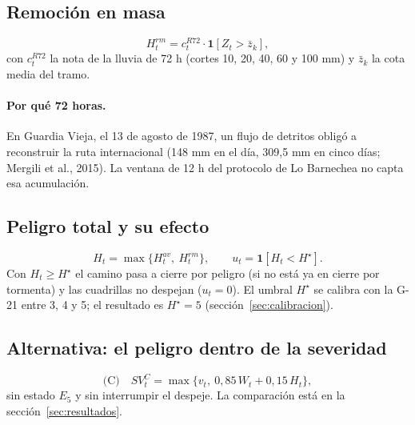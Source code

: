 \subsection{Remoción en masa}
\begin{equation}
H^{rm}_t = c^{R72}_t \cdot \mathbf{1}\!\left[Z_t > \bar z_k\right],
\end{equation}
con $c^{R72}_t$ la nota de la lluvia de 72 h (cortes 10, 20, 40, 60 y 100 mm) y $\bar z_k$ la cota media del tramo.

\paragraph{Por qué 72 horas.} En Guardia Vieja, el 13 de agosto de 1987, un flujo de detritos obligó a reconstruir la ruta internacional (148 mm en el día, 309,5 mm en cinco días; Mergili et al., 2015). La ventana de 12 h del protocolo de Lo Barnechea no capta esa acumulación.

\subsection{Peligro total y su efecto}
\begin{equation}
H_t = \max\{H^{av}_t,\ H^{rm}_t\}, \qquad u_t = \mathbf{1}\!\left[H_t < H^{\star}\right].
\end{equation}
Con $H_t \ge H^\star$ el camino pasa a cierre por peligro (si no está ya en cierre por tormenta) y las cuadrillas no despejan ($u_t = 0$). El umbral $H^\star$ se calibra con la G-21 entre 3, 4 y 5; el resultado es $H^\star = 5$ (sección~\ref{sec:calibracion}).

\subsection{Alternativa: el peligro dentro de la severidad}\label{sec:peligro_dentro}
\begin{equation}
\text{(C)}\quad SV^{C}_t = \max\big\{v_t,\ 0{,}85\, W_t + 0{,}15\, H_t\big\},
\end{equation}
sin estado $E_5$ y sin interrumpir el despeje. La comparación está en la sección~\ref{sec:resultados}.

